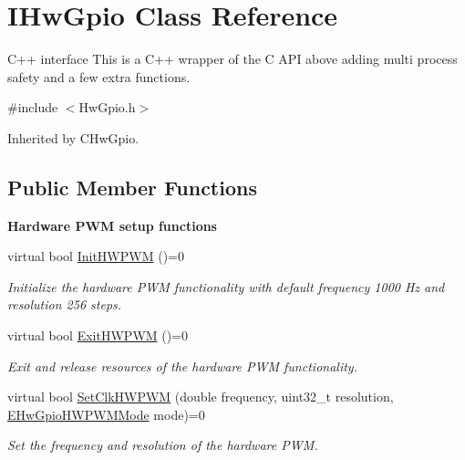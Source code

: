 \hypertarget{classIHwGpio}{}\section{I\+Hw\+Gpio Class Reference}
\label{classIHwGpio}


C++ interface This is a C++ wrapper of the C A\+PI above adding multi process safety and a few extra functions.  




{\ttfamily \#include $<$Hw\+Gpio.\+h$>$}



Inherited by C\+Hw\+Gpio.

\subsection*{Public Member Functions}
\begin{Indent}\textbf{ Hardware P\+WM setup functions}\par
\begin{DoxyCompactItemize}
\item 
virtual bool \hyperlink{classIHwGpio_ae383c9085032483c3e7edd50ae6b3989}{Init\+H\+W\+P\+WM} ()=0
\begin{DoxyCompactList}\small\item\em Initialize the hardware P\+WM functionality with default frequency 1000 Hz and resolution 256 steps. \end{DoxyCompactList}\item 
virtual bool \hyperlink{classIHwGpio_a66811dfbca832afe93774dc50cff8579}{Exit\+H\+W\+P\+WM} ()=0
\begin{DoxyCompactList}\small\item\em Exit and release resources of the hardware P\+WM functionality. \end{DoxyCompactList}\item 
virtual bool \hyperlink{classIHwGpio_afe7c0f0224564e0c480199ef2f9518d8}{Set\+Clk\+H\+W\+P\+WM} (double frequency, uint32\+\_\+t resolution, \hyperlink{HwGpio_8h_a4f85e40afc7a7a55f67f869d4f304c94}{E\+Hw\+Gpio\+H\+W\+P\+W\+M\+Mode} mode)=0
\begin{DoxyCompactList}\small\item\em Set the frequency and resolution of the hardware P\+WM. \end{DoxyCompactList}\end{DoxyCompactItemize}
\end{Indent}
